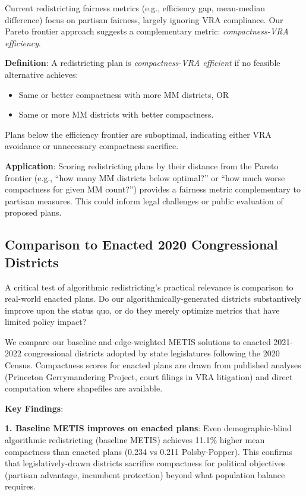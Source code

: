 Current redistricting fairness metrics (e.g., efficiency gap, mean-median difference) focus on partisan fairness, largely ignoring VRA compliance. Our Pareto frontier approach suggests a complementary metric: \emph{compactness-VRA efficiency}.

\textbf{Definition}: A redistricting plan is \emph{compactness-VRA efficient} if no feasible alternative achieves:
\begin{itemize}
    \item Same or better compactness with more MM districts, OR
    \item Same or more MM districts with better compactness.
\end{itemize}

Plans below the efficiency frontier are suboptimal, indicating either VRA avoidance or unnecessary compactness sacrifice.

\textbf{Application}: Scoring redistricting plans by their distance from the Pareto frontier (e.g., ``how many MM districts below optimal?'' or ``how much worse compactness for given MM count?'') provides a fairness metric complementary to partisan measures. This could inform legal challenges or public evaluation of proposed plans.

\subsection{Comparison to Enacted 2020 Congressional Districts}

A critical test of algorithmic redistricting's practical relevance is comparison to real-world enacted plans. Do our algorithmically-generated districts substantively improve upon the status quo, or do they merely optimize metrics that have limited policy impact?

We compare our baseline and edge-weighted METIS solutions to enacted 2021-2022 congressional districts adopted by state legislatures following the 2020 Census. Compactness scores for enacted plans are drawn from published analyses (Princeton Gerrymandering Project, court filings in VRA litigation) and direct computation where shapefiles are available.



\textbf{Key Findings}:

\textbf{1. Baseline METIS improves on enacted plans}: Even demographic-blind algorithmic redistricting (baseline METIS) achieves 11.1\% higher mean compactness than enacted plans (0.234 vs 0.211 Polsby-Popper). This confirms that legislatively-drawn districts sacrifice compactness for political objectives (partisan advantage, incumbent protection) beyond what population balance requires.

